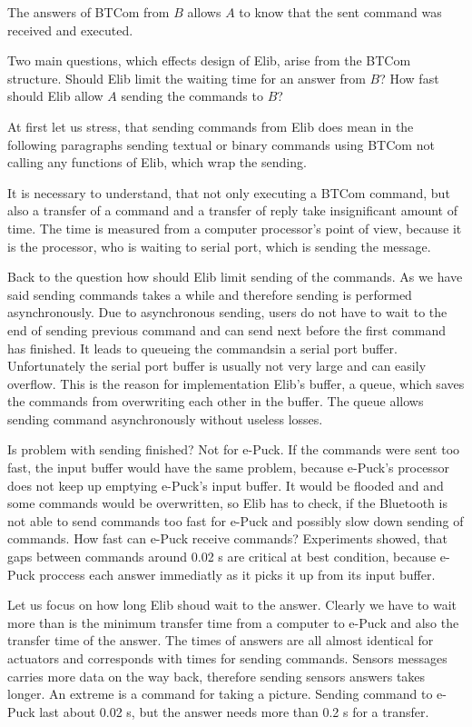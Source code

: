 	  
	The answers of BTCom from $B$ allows $A$ to know that the sent command was received and
	executed. 
	 
	Two main questions, which effects design of Elib, arise from the BTCom structure.
	Should Elib limit the waiting time for an answer from $B$?
	How fast should Elib allow $A$ sending the commands to $B$?
	 
	At first let us stress, that sending commands from Elib does mean in the following paragraphs
	sending textual or binary commands
	using BTCom not calling any functions of Elib, which wrap the sending. 
	 
	It is necessary to understand, that not only executing a BTCom command, but also a transfer of a command and a transfer of
	reply take insignificant amount of time. The time is measured from a computer processor's point of view, because
	it is the processor, who is waiting to serial port, which is sending the message.
	 
	Back to the question how should Elib limit sending of the commands.
	As we have said sending commands takes a while and therefore sending is performed asynchronously. 
	Due to asynchronous sending, users do not have to wait to the end of sending previous command and
	can send next before the first command has finished.
	It leads to queueing the commandsin a serial port buffer. Unfortunately the serial port buffer is usually not 
	very large and can easily overflow. 
	This is the reason for implementation Elib's buffer, a queue, which saves the commands
	from overwriting each other in the buffer. 
	The queue allows sending command asynchronously without useless losses.
	 
	Is problem with sending finished? Not for e-Puck. If the commands were sent too fast,
	the input buffer would have the same problem, because e-Puck's processor does not keep up emptying e-Puck's
	input buffer. It would be flooded and and some commands would be overwritten, 
	so Elib has to check, if the Bluetooth is not able to send commands too fast for e-Puck
	and possibly slow down sending of commands.
	How fast can e-Puck receive commands? Experiments showed, that gaps between commands around 0.02 s are critical at best condition,
	because e-Puck proccess each answer immediatly as it picks it up from its input buffer.
	 
	Let us focus on how long Elib shoud wait to the answer.
	Clearly we have to wait more than is the minimum transfer time from a computer to e-Puck and also
	the transfer time of the answer.
	The times of answers are all almost identical for actuators and corresponds with times for sending commands.
	Sensors messages carries more data on the way back, therefore sending sensors answers takes longer.
	An extreme is a command for taking a picture. Sending command to e-Puck last about 0.02 s, but
	the answer needs more than 0.2 s for a transfer.
	 
